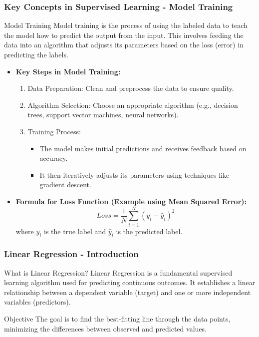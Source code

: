 \documentclass[aspectratio=169]{beamer}
\begin{document}
\begin{frame}[fragile]
    \frametitle{Key Concepts in Supervised Learning - Model Training}
    \begin{block}{Model Training}
        Model training is the process of using the labeled data to teach the model how to predict the output from the input. This involves feeding the data into an algorithm that adjusts its parameters based on the loss (error) in predicting the labels.
    \end{block}
    
    \begin{itemize}
        \item \textbf{Key Steps in Model Training:}
        \begin{enumerate}
            \item Data Preparation: Clean and preprocess the data to ensure quality.
            \item Algorithm Selection: Choose an appropriate algorithm (e.g., decision trees, support vector machines, neural networks).
            \item Training Process:
            \begin{itemize}
                \item The model makes initial predictions and receives feedback based on accuracy.
                \item It then iteratively adjusts its parameters using techniques like gradient descent.
            \end{itemize}
        \end{enumerate}
        \item \textbf{Formula for Loss Function (Example using Mean Squared Error):}
        \begin{equation}
        Loss = \frac{1}{N} \sum_{i=1}^{N} (y_i - \hat{y}_i)^2
        \end{equation}
        where \( y_i \) is the true label and \( \hat{y}_i \) is the predicted label.
    \end{itemize}
\end{frame}

\begin{frame}[fragile]
    \frametitle{Linear Regression - Introduction}
    \begin{block}{What is Linear Regression?}
        Linear Regression is a fundamental supervised learning algorithm used for predicting continuous outcomes. It establishes a linear relationship between a dependent variable (target) and one or more independent variables (predictors).
    \end{block}
    \begin{block}{Objective}
        The goal is to find the best-fitting line through the data points, minimizing the differences between observed and predicted values.
    \end{block}
\end{frame}
\end{document}

